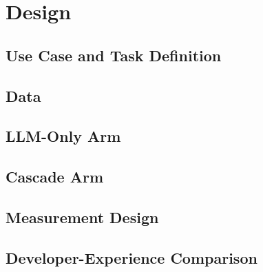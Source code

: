 \chapter{Design}\label{ch:design}

\section{Use Case and Task Definition}
\section{Data}
\section{LLM-Only Arm}
\section{Cascade Arm}
\section{Measurement Design}
\section{Developer-Experience Comparison}
